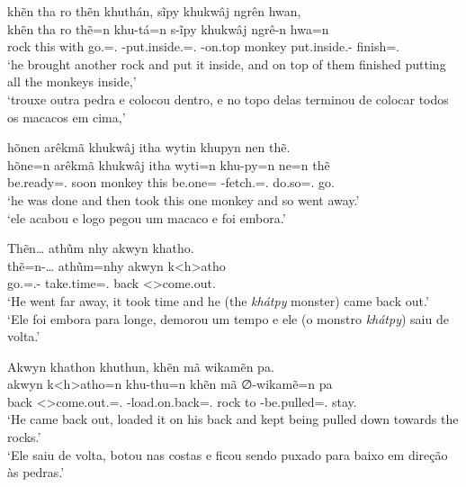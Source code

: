 \documentclass[output=paper,
modfonts,nonflat
]{langsci/langscibook}
\begin{document}
\ea  khẽn tha ro thẽn khuthán, sĩpy khukwâj ngrên hwan, \\[.3em]
\gll khẽn tha  ro   thẽ=n             khu-tá=n                         s-ĩpy         khukwâj ngrê-n                 hwa=n             \\
     rock this with go.\Sg=\AAnd.\Ss{} \Third-put.inside.\Sg=\AAnd.\Ss{} \Third-on.top monkey  put.inside.\Pl-\Nmlz{} finish=\AAnd.\Ss{} \\
\glt `he brought another rock and put it inside, and on top of them finished putting all the monkeys inside,' \\
     `trouxe outra pedra e colocou dentro, e no topo delas terminou de colocar todos os macacos em cima,' \\
\z

\ea  hõnen arêkmã khukwâj itha wytin khupyn nen thẽ. \\[.3em]
\gll hõne=n              arêkmã khukwâj itha wyti=n        khu-py=n                    ne=n             thẽ      \\
     be.ready=\AAnd.\Ss{} soon   monkey  this be.one=\AAnd{} \Third-fetch.\Sg=\AAnd.\Ss{} do.so=\AAnd.\Ss{} go.\Sg{} \\
\glt `he was done and then took this one monkey and so went away.' \\
     `ele acabou e logo pegou um macaco e foi embora.' \\
\label{exe:ithawyti}
\z

\ea  Thẽn\ldots{} athũm nhy akwyn khatho. \\[.3em]
\gll thẽ=n-\ldots{}             athũm=nhy            akwyn k<h>atho               \\
     go.\Sg=\AAnd.\Ss{}-\Ints{} take.time=\AAnd.\Ds{} back  <\Third>come.out.\Sg{} \\
\glt `He went far away, it took time and he (the \textit{khátpy} monster) came back out.' \\
     `Ele foi embora para longe, demorou um tempo e ele (o monstro \textit{khátpy}) saiu de volta.' \\
\z

\ea  Akwyn khathon khuthun, khẽn mã wikamẽn pa. \\[.3em]
\gll akwyn k<h>atho=n                      khu-thu=n                      khẽn mã ∅-wikamẽ=n                  pa         \\
     back  <\Third>come.out.\Sg=\AAnd.\Ss{} \Third-load.on.back=\AAnd.\Ss{} rock to \Third-be.pulled=\AAnd.\Ss{} stay.\Pl{} \\
\glt `He came back out, loaded it on his back and kept being pulled down towards the rocks.' \\
     `Ele saiu de volta, botou nas costas e ficou sendo puxado para baixo em direção às pedras.' \\
\z
\end{document}
